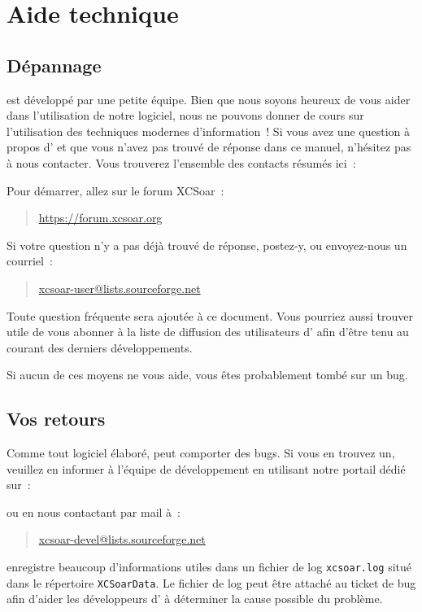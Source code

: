 \section{Aide technique}

\subsection*{Dépannage}
\xc{} est développé par une petite équipe. Bien que nous soyons heureux de vous aider dans 
l'utilisation de notre logiciel, nous ne pouvons donner de cours sur l'utilisation des techniques
modernes d'information~! Si vous avez une question à propos d'\xc{} et que vous n'avez pas 
trouvé de réponse dans ce manuel, n'hésitez pas à nous contacter.
Vous trouverez l'ensemble des contacts résumés ici~:
\begin{quote}
\end{quote}

Pour démarrer, allez sur le forum XCSoar~:
\begin{quote}
	\url{https://forum.xcsoar.org}
\end{quote}
Si votre question n'y a pas déjà trouvé de réponse, postez-y, ou envoyez-nous un courriel~:
\begin{quote}
	\href{mailto:xcsoar-user@lists.sourceforge.net}{xcsoar-user@lists.sourceforge.net}
\end{quote}
Toute question fréquente sera ajoutée à ce document.
Vous pourriez aussi trouver utile de vous abonner à la liste de diffusion des utilisateurs
d'\xc{} afin d'être tenu au courant des derniers développements.

Si aucun de ces moyens ne vous aide, vous êtes probablement tombé sur un bug.

\subsection*{Vos retours}
Comme tout logiciel élaboré, \xc{} peut comporter des bugs. Si vous en trouvez un,
veuillez en informer à l'équipe de développement en utilisant notre portail dédié sur~:
\begin{quote}
\end{quote}
ou en nous contactant par mail à~:
\begin{quote}
\href{mailto:xcsoar-devel@lists.sourceforge.net}{xcsoar-devel@lists.sourceforge.net}
\end{quote}
\xc{} enregistre beaucoup d'informations utiles dans un fichier de log
\verb|xcsoar.log| situé dans le répertoire \texttt{XCSoarData}. Le fichier de log peut être attaché
au ticket de bug afin d'aider les développeurs d'\xc{} à déterminer la cause possible du problème.

